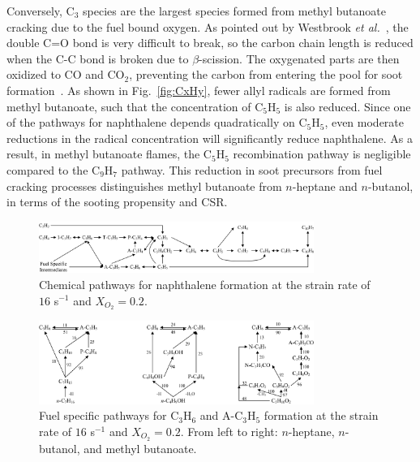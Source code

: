 \documentclass[review,3p,times]{elsarticleUS}
\begin{document}
Conversely, C$_3$ species are the largest species formed from methyl butanoate cracking due to the fuel bound oxygen. As pointed out by Westbrook \emph{et al.}~\cite{westbrook06}, the double C=O bond is very difficult to break, so the carbon chain length is reduced when the C-C bond is broken due to $\beta$-scission. The oxygenated parts are then oxidized to CO and CO$_2$, preventing the carbon from entering the pool for soot formation~\cite{feng12,wangyl11}. As shown in Fig.~\ref{fig:CxHy}, fewer allyl radicals are formed from methyl butanoate, such that the concentration of C$_5$H$_5$ is also reduced. Since one of the pathways for naphthalene depends quadratically on C$_5$H$_5$, even moderate reductions in the radical concentration will significantly reduce naphthalene. As a result, in methyl butanoate flames, the C$_5$H$_5$ recombination pathway is negligible compared to the C$_9$H$_7$ pathway. This reduction in soot precursors from fuel cracking processes distinguishes methyl butanoate from $n$-heptane 
and $n$-butanol, in terms of the sooting propensity and CSR.

\begin{figure}[t]
  \centering
  \scriptsize
  \includegraphics[width=0.8\textwidth]{Pathways-PAH.png}
  \normalsize
  \caption{Chemical pathways for naphthalene formation at the strain rate of $16$ s$^{-1}$ and $X_{O_2}=0.2$.}
  \label{fig:Pathways_PAH}
\end{figure}

\begin{figure}[t]
  \centering
  \scriptsize
  \includegraphics[width=0.8\textwidth]{Pathways_Fuel.png}
  \normalsize
  \caption{Fuel specific pathways for C$_3$H$_6$ and A-C$_3$H$_5$ formation at the strain rate of $16$ s$^{-1}$ and $X_{O_2}=0.2$. From left to right: $n$-heptane, $n$-butanol, and methyl butanoate.}
  \label{fig:Pathways_Fuel}
\end{figure}
\end{document}
